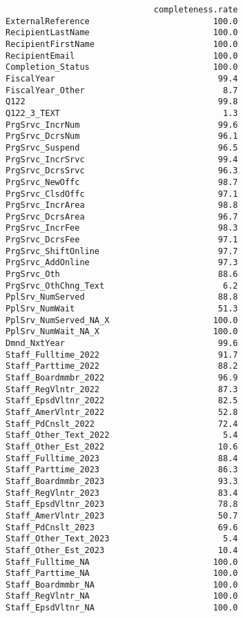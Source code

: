 \documentclass[
  letterpaper,
]{scrbook}
\begin{document}
\begin{verbatim}
                              completeness.rate
ExternalReference                         100.0
RecipientLastName                         100.0
RecipientFirstName                        100.0
RecipientEmail                            100.0
Completion_Status                         100.0
FiscalYear                                 99.4
FiscalYear_Other                            8.7
Q122                                       99.8
Q122_3_TEXT                                 1.3
PrgSrvc_IncrNum                            99.6
PrgSrvc_DcrsNum                            96.1
PrgSrvc_Suspend                            96.5
PrgSrvc_IncrSrvc                           99.4
PrgSrvc_DcrsSrvc                           96.3
PrgSrvc_NewOffc                            98.7
PrgSrvc_ClsdOffc                           97.1
PrgSrvc_IncrArea                           98.8
PrgSrvc_DcrsArea                           96.7
PrgSrvc_IncrFee                            98.3
PrgSrvc_DcrsFee                            97.1
PrgSrvc_ShiftOnline                        97.7
PrgSrvc_AddOnline                          97.3
PrgSrvc_Oth                                88.6
PrgSrvc_OthChng_Text                        6.2
PplSrv_NumServed                           88.8
PplSrv_NumWait                             51.3
PplSrv_NumServed_NA_X                     100.0
PplSrv_NumWait_NA_X                       100.0
Dmnd_NxtYear                               99.6
Staff_Fulltime_2022                        91.7
Staff_Parttime_2022                        88.2
Staff_Boardmmbr_2022                       96.9
Staff_RegVlntr_2022                        87.3
Staff_EpsdVltnr_2022                       82.5
Staff_AmerVlntr_2022                       52.8
Staff_PdCnslt_2022                         72.4
Staff_Other_Text_2022                       5.4
Staff_Other_Est_2022                       10.6
Staff_Fulltime_2023                        88.4
Staff_Parttime_2023                        86.3
Staff_Boardmmbr_2023                       93.3
Staff_RegVlntr_2023                        83.4
Staff_EpsdVltnr_2023                       78.8
Staff_AmerVlntr_2023                       50.7
Staff_PdCnslt_2023                         69.6
Staff_Other_Text_2023                       5.4
Staff_Other_Est_2023                       10.4
Staff_Fulltime_NA                         100.0
Staff_Parttime_NA                         100.0
Staff_Boardmmbr_NA                        100.0
Staff_RegVlntr_NA                         100.0
Staff_EpsdVltnr_NA                        100.0

\end{verbatim}
\end{document}
